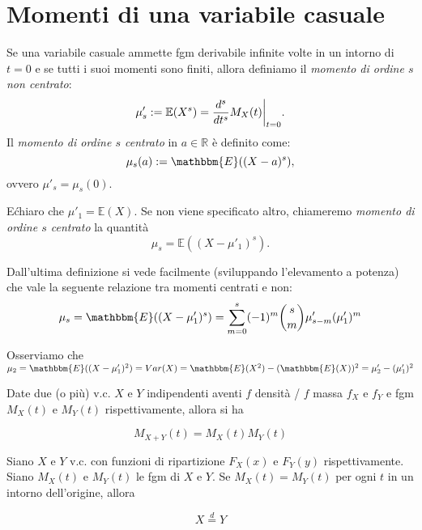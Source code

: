 \section{Momenti di una variabile casuale}

\begin{dfn}
Se una variabile casuale ammette fgm derivabile infinite volte in un intorno di \(t=0\) e se tutti i suoi momenti sono finiti, allora definiamo il \emph{momento di ordine \(s\) non centrato}: 
\begin{equation}
  \mu'_s := \mathbb{E}(X^s) = \restr{\frac{d^s}{dt^s} M_X(t)}{t=0}.
\end{equation} 
Il \emph{momento di ordine \(s\) centrato} in \(a \in \mathbb{R}\) è definito come: 
\begin{equation}
  \mu_s (a) := \mathbbm{E} ((X-a)^s),
\end{equation}
ovvero $\mu'_s = \mu_s (0)$.

\end{dfn}

\begin{oss}
  E\' chiaro che \(\mu'_1 = \mathbb{E}(X)\). Se non viene specificato altro, chiameremo \emph{momento di ordine \(s\) centrato} la quantità
  \begin{equation}
    \mu_s = \mathbb{E}((X-\mu'_1)^s).
  \end{equation}
\end{oss}

\begin{teo}
Dall'ultima definizione si vede facilmente (sviluppando l'elevamento a potenza) che vale la seguente relazione tra momenti centrati e non:
$$\mu_s = \mathbbm{E} ((X-\mu'_1)^s) = \displaystyle\sum_{m=0}^s (-1)^m \binom{s}{m} \mu'_{s-m} (\mu'_1)^m$$
\end{teo}
Osserviamo che $\mu_2 = \mathbbm{E} ((X-\mu'_1)^2) = Var(X) = \mathbbm{E} (X^2) - (\mathbbm{E} (X))^2 = \mu'_2 - (\mu'_1)^2$


\begin{teo}
Date due (o più) v.c. $X$ e $Y$ indipendenti aventi $f$ densità / $f$ massa $f_X$ e $f_Y$ e fgm $M_X(t)$ e $M_Y(t)$ rispettivamente, allora si ha

$$M_{X+Y}(t) = M_X(t) M_Y(t)$$
\end{teo}

\begin{teo}
Siano $X$ e $Y$ v.c. con funzioni di ripartizione $F_X(x)$ e $F_Y(y)$ rispettivamente. Siano $M_X(t)$ e $M_Y(t)$ le fgm di $X$ e $Y$. Se $M_X(t) = M_Y(t)$ per ogni $t$ in un intorno dell'origine, allora 

$$X \stackrel{d}{=} Y$$
\end{teo}

